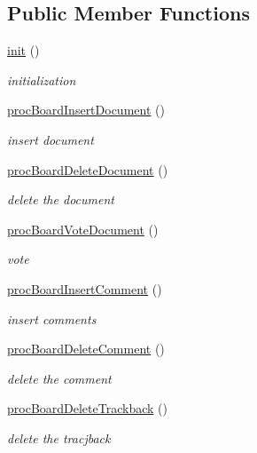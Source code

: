 \subsection*{Public Member Functions}
\begin{DoxyCompactItemize}
\item 
\hyperlink{classboardController_a1e9dcbf2879520adc6c5ce9b68361408}{init} ()
\begin{DoxyCompactList}\small\item\em initialization \end{DoxyCompactList}\item 
\hyperlink{classboardController_a14ee978c5be08ee33f4c00a6960c4e60}{proc\+Board\+Insert\+Document} ()
\begin{DoxyCompactList}\small\item\em insert document \end{DoxyCompactList}\item 
\hyperlink{classboardController_a3e67502fb41d52a0425f40906029576b}{proc\+Board\+Delete\+Document} ()
\begin{DoxyCompactList}\small\item\em delete the document \end{DoxyCompactList}\item 
\hyperlink{classboardController_a8ff91d133ca5ca109b91f218ff306738}{proc\+Board\+Vote\+Document} ()
\begin{DoxyCompactList}\small\item\em vote \end{DoxyCompactList}\item 
\hyperlink{classboardController_ab643a9d4d386833e92bc2d7114319fb2}{proc\+Board\+Insert\+Comment} ()
\begin{DoxyCompactList}\small\item\em insert comments \end{DoxyCompactList}\item 
\hyperlink{classboardController_af5cfe27b152d9806acf0ced54299b0ea}{proc\+Board\+Delete\+Comment} ()
\begin{DoxyCompactList}\small\item\em delete the comment \end{DoxyCompactList}\item 
\hyperlink{classboardController_a8a71a5c163777a169a3e843c2f6dafae}{proc\+Board\+Delete\+Trackback} ()
\begin{DoxyCompactList}\small\item\em delete the tracjback \end{DoxyCompactList}\item 

\end{DoxyCompactItemize}

